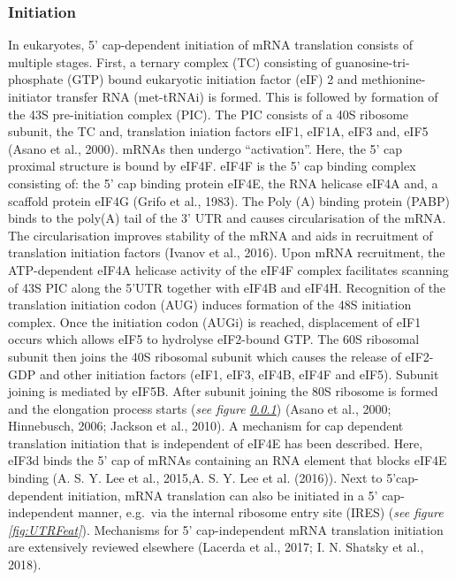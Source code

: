 \documentclass[12pt,openany]{book}
\begin{document}
\clearpage

\subsubsection{Initiation} \label{initiation}

In eukaryotes, 5' cap-dependent initiation of mRNA translation consists
of multiple stages. First, a ternary complex (TC) consisting of
guanosine-tri-phosphate (GTP) bound eukaryotic initiation factor (eIF) 2
and methionine-initiator transfer RNA (met-tRNAi) is formed. This is
followed by formation of the 43S pre-initiation complex (PIC). The PIC
consists of a 40S ribosome subunit, the TC and, translation iniation
factors eIF1, eIF1A, eIF3 and, eIF5 (Asano et al., 2000). mRNAs then
undergo ``activation''. Here, the 5' cap proximal structure is bound by
eIF4F. eIF4F is the 5' cap binding complex consisting of: the 5' cap
binding protein eIF4E, the RNA helicase eIF4A and, a scaffold protein
eIF4G (Grifo et al., 1983). The Poly (A) binding protein (PABP) binds to
the poly(A) tail of the 3' UTR and causes circularisation of the mRNA.
The circularisation improves stability of the mRNA and aids in
recruitment of translation initiation factors (Ivanov et al., 2016).
Upon mRNA recruitment, the ATP-dependent eIF4A helicase activity of the
eIF4F complex facilitates scanning of 43S PIC along the 5'UTR together
with eIF4B and eIF4H. Recognition of the translation initiation codon
(AUG) induces formation of the 48S initiation complex. Once the
initiation codon (AUGi) is reached, displacement of eIF1 occurs which
allows eIF5 to hydrolyse eIF2-bound GTP. The 60S ribosomal subunit then
joins the 40S ribosomal subunit which causes the release of eIF2-GDP and
other initiation factors (eIF1, eIF3, eIF4B, eIF4F and eIF5). Subunit
joining is mediated by eIF5B. After subunit joining the 80S ribosome is
formed and the elongation process starts (\emph{see figure
\ref{initiation}}) (Asano et al., 2000; Hinnebusch, 2006; Jackson et
al., 2010). A mechanism for cap dependent translation initiation that is
independent of eIF4E has been described. Here, eIF3d binds the 5' cap of
mRNAs containing an RNA element that blocks eIF4E binding (A. S. Y. Lee
et al., 2015,A. S. Y. Lee et al. (2016)). Next to 5'cap-dependent
initiation, mRNA translation can also be initiated in a 5'
cap-independent manner, e.g.~via the internal ribosome entry site (IRES)
(\emph{see figure \ref{fig:UTRFeat}}). Mechanisms for 5' cap-independent
mRNA translation initiation are extensively reviewed elsewhere (Lacerda
et al., 2017; I. N. Shatsky et al., 2018).
\end{document}
